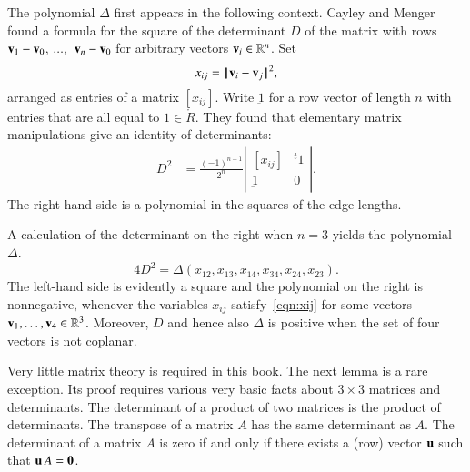 \begin{remark}\label{rem:cayley}
  The polynomial $\Delta$ first appears in the following context.
  Cayley and Menger found a formula for the square of the determinant
  $D$ of the matrix with rows ${\mathbf v}_1-{\mathbf v}_0$, $\ldots,$ ${\mathbf v}_n-{\mathbf v}_0$ for
  arbitrary vectors ${\mathbf v}_i\in\mathbb{R}^n$.  Set
\begin{equation}\label{eqn:xij}
x_{ij} = \norm{\v_i}{\v_j}^2,
\end{equation}
arranged as entries of a matrix $[x_{ij}]$.
Write $\underbar 1$ for a row vector of length $n$ 
with entries that are all equal to $1\in\ring{R}$.
They found that elementary matrix manipulations give an identity
of determinants:
\begin{align}\label{eqn:cmd}
D^2 &= \frac{(-1)^{n-1}}{2^n}
\left|\begin{matrix}[x_{ij}]& {}^t{\underbar 1}\\ {\underbar 1}& 0
\end{matrix}\right|.
\end{align}
The right-hand side is a polynomial in the squares of the edge lengths.

A calculation of the determinant on the right when $n=3$ yields 
the polynomial $\Delta$.
\[ 
4 D^2 = \Delta(x_{12},x_{13},x_{14},x_{34},x_{24},x_{23}).
\] 
The left-hand side is evidently a square and the polynomial on the
right is nonnegative, whenever the variables $x_{ij}$
satisfy~\eqref{eqn:xij} for some vectors
${\mathbf v}_1,\ldots,{\mathbf v}_4\in\mathbb{R}^3$.  Moreover, $D$ and hence also
$\Delta$ is positive when the set of four vectors is not
coplanar.
\end{remark}
%
%
%
%
%

\begin{background}\label{back:matrix}
  Very little matrix theory is required in this book.  The next lemma
  is a rare exception.  Its proof requires various very basic facts
  about $3\times 3$ matrices and determinants.  The determinant of a
  product of two matrices is the product of determinants.  The
  transpose of a matrix $A$ has the same determinant as $A$.  The
  determinant of a matrix $A$ is zero if and only if there exists a
  (row) vector ${\mathbf u}$ such that ${\mathbf u}\, A = {\mathbf 0}$.
\end{background}


